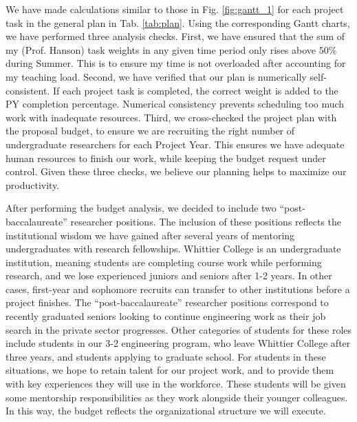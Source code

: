 \documentclass[11pt]{amsart}
\begin{document}
We have made calculations similar to those in Fig. \ref{fig:gantt_1} for each project task in the general plan in Tab. \ref{tab:plan}.  Using the corresponding Gantt charts, we have performed three analysis checks.  First, we have ensured that the sum of my (Prof. Hanson) task weights in any given time period only rises above $50\%$ during Summer.  This is to ensure my time is not overloaded after accounting for my teaching load.  Second, we have verified that our plan is numerically self-consistent.  If each project task is completed, the correct weight is added to the PY completion percentage.  Numerical consistency prevents scheduling too much work with inadequate resources.  Third, we cross-checked the project plan with the proposal budget, to ensure we are recruiting the right number of undergraduate researchers for each Project Year.  This ensures we have adequate human resources to finish our work, while keeping the budget request under control.  Given these three checks, we believe our planning helps to maximize our productivity.

After performing the budget analysis, we decided to include two ``post-baccalaureate'' researcher positions.  The inclusion of these positions reflects the institutional wisdom we have gained after several years of mentoring undergraduates with research fellowships.  Whittier College is an undergraduate institution, meaning students are completing course work while performing research, and we lose experienced juniors and seniors after 1-2 years.  In other cases, first-year and sophomore recruits can transfer to other institutions before a project finishes.  The ``post-baccalaureate'' researcher positions correspond to recently graduated seniors looking to continue engineering work as their job search in the private sector progresses.  Other categories of students for these roles include students in our 3-2 engineering program, who leave Whittier College after three years, and students applying to graduate school. For students in these situations, we hope to retain talent for our project work, and to provide them with key experiences they will use in the workforce.  These students will be given some mentorship responsibilities as they work alongside their younger colleagues.  In this way, the budget reflects the organizational structure we will execute.
\end{document}
